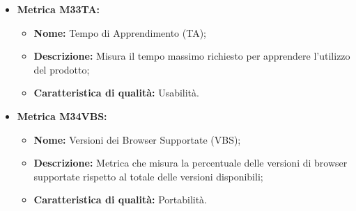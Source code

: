 \begin{itemize}
    \vspace{0.4cm}
    \item \hypertarget{item:M33TA}{\textbf{Metrica M33TA:}}
    \vspace{0.2cm}
        
    \begin{minipage}[H]{0.9\textwidth}
        \begin{itemize}
            \item \textbf{Nome:} Tempo di Apprendimento (TA);
            \item \textbf{Descrizione:} Misura il tempo massimo richiesto per apprendere l'utilizzo del prodotto;
            \item \textbf{Caratteristica di qualità:} Usabilità.
        \end{itemize}
    \end{minipage}

    \vspace{0.4cm}
    \item \hypertarget{item:M34VBS}{\textbf{Metrica M34VBS:}}
    \vspace{0.2cm}
        
    \begin{minipage}[H]{0.9\textwidth}
        \begin{itemize}
            \item \textbf{Nome:} Versioni dei Browser Supportate (VBS);
            \item \textbf{Descrizione:} Metrica che misura la percentuale delle versioni di browser supportate rispetto al totale delle versioni disponibili;
            \item \textbf{Caratteristica di qualità:} Portabilità.
        \end{itemize}
    \end{minipage}

\end{itemize}